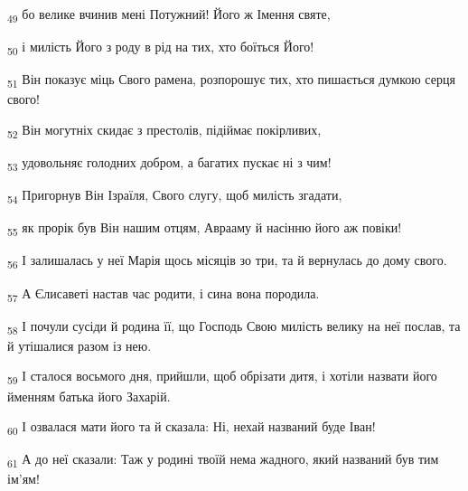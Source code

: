 \begin{tcolorbox}
\textsubscript{49} бо велике вчинив мені Потужний! Його ж Імення святе,
\end{tcolorbox}
\begin{tcolorbox}
\textsubscript{50} і милість Його з роду в рід на тих, хто боїться Його!
\end{tcolorbox}
\begin{tcolorbox}
\textsubscript{51} Він показує міць Свого рамена, розпорошує тих, хто пишається думкою серця свого!
\end{tcolorbox}
\begin{tcolorbox}
\textsubscript{52} Він могутніх скидає з престолів, підіймає покірливих,
\end{tcolorbox}
\begin{tcolorbox}
\textsubscript{53} удовольняє голодних добром, а багатих пускає ні з чим!
\end{tcolorbox}
\begin{tcolorbox}
\textsubscript{54} Пригорнув Він Ізраїля, Свого слугу, щоб милість згадати,
\end{tcolorbox}
\begin{tcolorbox}
\textsubscript{55} як прорік був Він нашим отцям, Аврааму й насінню його аж повіки!
\end{tcolorbox}
\begin{tcolorbox}
\textsubscript{56} І залишалась у неї Марія щось місяців зо три, та й вернулась до дому свого.
\end{tcolorbox}
\begin{tcolorbox}
\textsubscript{57} А Єлисаветі настав час родити, і сина вона породила.
\end{tcolorbox}
\begin{tcolorbox}
\textsubscript{58} І почули сусіди й родина її, що Господь Свою милість велику на неї послав, та й утішалися разом із нею.
\end{tcolorbox}
\begin{tcolorbox}
\textsubscript{59} І сталося восьмого дня, прийшли, щоб обрізати дитя, і хотіли назвати його йменням батька його Захарій.
\end{tcolorbox}
\begin{tcolorbox}
\textsubscript{60} І озвалася мати його та й сказала: Ні, нехай названий буде Іван!
\end{tcolorbox}
\begin{tcolorbox}
\textsubscript{61} А до неї сказали: Таж у родині твоїй нема жадного, який названий був тим ім'ям!
\end{tcolorbox}
